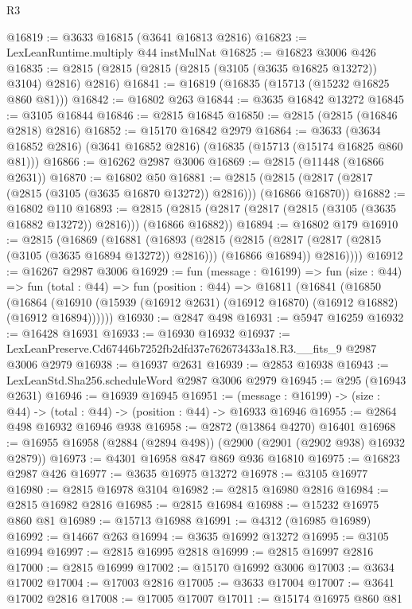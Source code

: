 \begin{lexlean}{R3}
\begin{coremodule}
@16819 := @3633 @16815 (@3641 @16813 @2816)
@16823 := LexLeanRuntime.multiply @44 instMulNat
@16825 := @16823 @3006 @426
@16835 := @2815 (@2815 (@2815 (@2815 (@3105 (@3635 @16825 @13272)) @3104) @2816) @2816)
@16841 := @16819 (@16835 (@15713 (@15232 @16825 @860 @81)))
@16842 := @16802 @263
@16844 := @3635 @16842 @13272
@16845 := @3105 @16844
@16846 := @2815 @16845
@16850 := @2815 (@2815 (@16846 @2818) @2816)
@16852 := @15170 @16842 @2979
@16864 := @3633 (@3634 @16852 @2816) (@3641 @16852 @2816) (@16835 (@15713 (@15174 @16825 @860 @81)))
@16866 := @16262 @2987 @3006
@16869 := @2815 (@11448 (@16866 @2631))
@16870 := @16802 @50
@16881 := @2815 (@2815 (@2817 (@2817 (@2815 (@3105 (@3635 @16870 @13272)) @2816))) (@16866 @16870))
@16882 := @16802 @110
@16893 := @2815 (@2815 (@2817 (@2817 (@2815 (@3105 (@3635 @16882 @13272)) @2816))) (@16866 @16882))
@16894 := @16802 @179
@16910 := @2815
    (@16869
      (@16881
        (@16893
          (@2815
            (@2815 (@2817 (@2817 (@2815 (@3105 (@3635 @16894 @13272)) @2816))) (@16866 @16894))
            @2816))))
@16912 := @16267 @2987 @3006
@16929 := fun (message : @16199) =>
  fun (size : @44) =>
  fun (total : @44) =>
  fun (position : @44) =>
  @16811
    (@16841
      (@16850
        (@16864 (@16910 (@15939 (@16912 @2631) (@16912 @16870) (@16912 @16882) (@16912 @16894))))))
@16930 := @2847 @498
@16931 := @5947 @16259
@16932 := @16428 @16931
@16933 := @16930 @16932
@16937 := LexLeanPreserve.Cd67446b7252fb2dfd37e762673433a18.R3.__fits_9 @2987 @3006 @2979
@16938 := @16937 @2631
@16939 := @2853 @16938
@16943 := LexLeanStd.Sha256.scheduleWord @2987 @3006 @2979
@16945 := @295 (@16943 @2631)
@16946 := @16939 @16945
@16951 := (message : @16199) -> (size : @44) -> (total : @44) -> (position : @44) -> @16933 @16946
@16955 := @2864 @498 @16932 @16946 @938
@16958 := @2872 (@13864 @4270) @16401
@16968 := @16955 @16958 (@2884 (@2894 @498)) (@2900 (@2901 (@2902 @938) @16932 @2879))
@16973 := @4301 @16958 @847 @869 @936 @16810
@16975 := @16823 @2987 @426
@16977 := @3635 @16975 @13272
@16978 := @3105 @16977
@16980 := @2815 @16978 @3104
@16982 := @2815 @16980 @2816
@16984 := @2815 @16982 @2816
@16985 := @2815 @16984
@16988 := @15232 @16975 @860 @81
@16989 := @15713 @16988
@16991 := @4312 (@16985 @16989)
@16992 := @14667 @263
@16994 := @3635 @16992 @13272
@16995 := @3105 @16994
@16997 := @2815 @16995 @2818
@16999 := @2815 @16997 @2816
@17000 := @2815 @16999
@17002 := @15170 @16992 @3006
@17003 := @3634 @17002
@17004 := @17003 @2816
@17005 := @3633 @17004
@17007 := @3641 @17002 @2816
@17008 := @17005 @17007
@17011 := @15174 @16975 @860 @81

\end{coremodule}
\end{lexlean}
